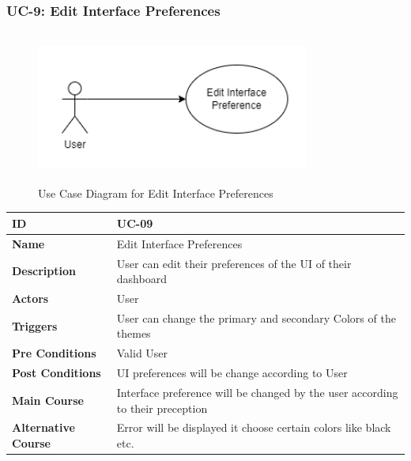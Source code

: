 \subsubsection{UC-9: Edit Interface Preferences}
\begin{figure}[H]
    \includegraphics[height=5cm, width=0.8\textwidth]{./diagrams/Use Case/u9.png}
    \centering
    \caption{Use Case Diagram for Edit Interface Preferences}
    \label{fig:Usecase1}
\end{figure}

\begin{center}
    \begin{tabularx}{\textwidth}{|l|X|}
        \hline
        \textbf{ID}                 & UC-09                                                                          \\
        \hline
        \textbf{Name}               & Edit Interface Preferences                                                     \\
        \hline
        \textbf{Description}        & User can edit their preferences of the UI of their dashboard                   \\
        \hline
        \textbf{Actors}             & User                                                                           \\
        \hline
        \textbf{Triggers}           & User can change the primary and secondary Colors of the themes                 \\
        \hline
        \textbf{Pre Conditions}     & Valid User                                                                     \\
        \hline
        \textbf{Post Conditions}    & UI preferences will be change according to User                                \\
        \hline
        \textbf{Main Course}        & Interface preference will be changed by the user according to their preception \\
        \hline
        \textbf{Alternative Course} & Error will be displayed it choose certain colors like black etc.               \\
        \hline
    \end{tabularx}
\end{center}
\newpage


